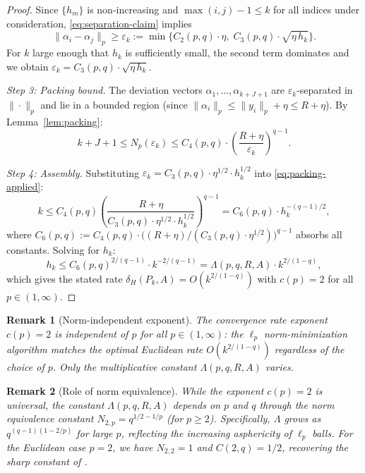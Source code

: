 \documentclass[11pt]{article}
\newtheorem{remark}{Remark}
\begin{document}
\begin{proof}
Since $\{h_m\}$ is non-increasing and $\max(i,j) - 1 \le k$ for all indices under consideration, \eqref{eq:separation-claim} implies
\begin{equation}\label{eq:separation-simplified}
\|\alpha_i - \alpha_j\|_p \ge \varepsilon_k := \min\bigl\{C_2(p,q) \cdot \eta,\; C_3(p,q) \cdot \sqrt{\eta \, h_k}\bigr\}.
\end{equation}
For $k$ large enough that $h_k$ is sufficiently small, the second term dominates and we obtain $\varepsilon_k = C_3(p,q) \cdot \sqrt{\eta \, h_k}$.

\medskip
\noindent\emph{Step 3: Packing bound.}
The deviation vectors $\alpha_1, \ldots, \alpha_{k+J+1}$ are $\varepsilon_k$-separated in $\|\cdot\|_p$ and lie in a bounded region (since $\|\alpha_i\|_p \le \|y_i\|_p + \eta \le R + \eta$). By Lemma~\ref{lem:packing}:
\begin{equation}\label{eq:packing-applied}
k + J + 1 \le N_p(\varepsilon_k) \le C_4(p, q) \cdot \left(\frac{R + \eta}{\varepsilon_k}\right)^{q-1}.
\end{equation}

\medskip
\noindent\emph{Step 4: Assembly.}
Substituting $\varepsilon_k = C_3(p,q) \cdot \eta^{1/2} \cdot h_k^{1/2}$ into \eqref{eq:packing-applied}:
\[
k \le C_4(p,q) \left(\frac{R + \eta}{C_3(p,q) \cdot \eta^{1/2} \cdot h_k^{1/2}}\right)^{q-1} = C_6(p,q) \cdot h_k^{-(q-1)/2},
\]
where $C_6(p,q) := C_4(p,q) \cdot \bigl((R+\eta) / (C_3(p,q) \cdot \eta^{1/2})\bigr)^{q-1}$ absorbs all constants. Solving for $h_k$:
\[
h_k \le C_6(p,q)^{2/(q-1)} \cdot k^{-2/(q-1)} = \Lambda(p,q,R,A) \cdot k^{2/(1-q)},
\]
which gives the stated rate $\delta_H(P_k, A) = O(k^{2/(1-q)})$ with $c(p) = 2$ for all $p \in (1,\infty)$.
\end{proof}

\begin{remark}[Norm-independent exponent]\label{rem:norm-independent}
The convergence rate exponent $c(p) = 2$ is independent of $p$ for all $p \in (1, \infty)$: the $\ell_p$ norm-minimization algorithm matches the optimal Euclidean rate $O(k^{2/(1-q)})$ regardless of the choice of $p$. Only the multiplicative constant $\Lambda(p,q,R,A)$ varies.
\end{remark}

\begin{remark}[Role of norm equivalence]\label{rem:norm-equiv-role}
While the exponent $c(p) = 2$ is universal, the constant $\Lambda(p, q, R, A)$ depends on $p$ and $q$ through the norm equivalence constant $N_{2,p} = q^{1/2-1/p}$ (for $p \ge 2$). Specifically, $\Lambda$ grows as $q^{(q-1)(1-2/p)}$ for large $p$, reflecting the increasing asphericity of $\ell_p$ balls. For the Euclidean case $p = 2$, we have $N_{2,2} = 1$ and $C(2,q) = 1/2$, recovering the sharp constant of \cite{Ararat2024}.
\end{remark}
\end{document}

